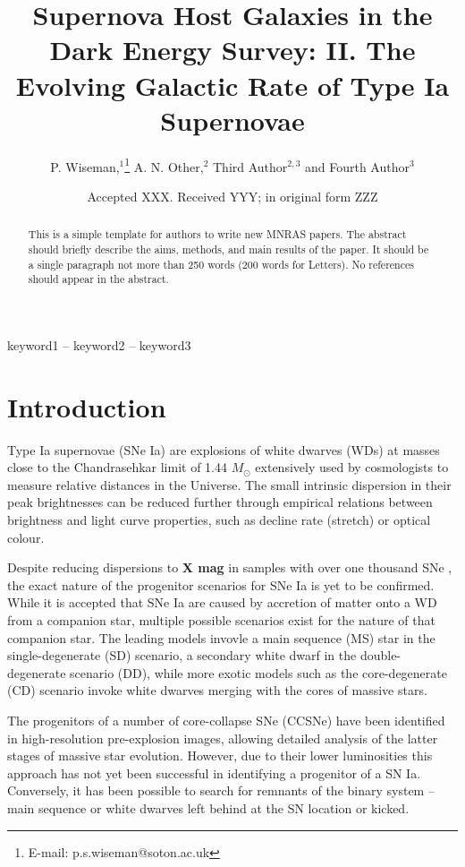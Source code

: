 \documentclass[fleqn,usenatbib]{mnras}
\title[DES SN Ia Galactic Rate]{Supernova Host Galaxies in the Dark Energy Survey: II. The Evolving Galactic Rate of Type Ia Supernovae}
\author[P. Wiseman et al.]{
P. Wiseman,$^{1}$\thanks{E-mail: p.s.wiseman@soton.ac.uk}
A. N. Other,$^{2}$
Third Author$^{2,3}$
and Fourth Author$^{3}$
\\
}
\date{Accepted XXX. Received YYY; in original form ZZZ}
\begin{document}
\label{firstpage}
\pagerange{\pageref{firstpage}--\pageref{lastpage}}
\maketitle

\begin{abstract}
This is a simple template for authors to write new MNRAS papers.
The abstract should briefly describe the aims, methods, and main results of the paper.
It should be a single paragraph not more than 250 words (200 words for Letters).
No references should appear in the abstract.
\end{abstract}

\begin{keywords}
keyword1 -- keyword2 -- keyword3
\end{keywords}



\section{Introduction}

Type Ia supernovae (SNe Ia) are explosions of white dwarves (WDs) at masses close to the Chandrasehkar limit of 1.44 $M_{\odot}$ extensively used by cosmologists to measure relative distances in the Universe. The small intrinsic dispersion in their peak brightnesses can be reduced further through empirical relations between brightness and light curve properties, such as decline rate (stretch) or optical colour.

Despite reducing dispersions to \textbf{X mag} in samples with over one thousand SNe \citep{Scolnic2018}, the exact nature of the progenitor scenarios for SNe Ia is yet to be confirmed. While it is accepted that SNe Ia are caused by accretion of matter onto a WD from a companion star, multiple possible scenarios exist for the nature of that companion star. The leading models invovle a main sequence (MS) star in the single-degenerate (SD) scenario, a secondary white dwarf in the double-degenerate scenario (DD), while more exotic models such as the core-degenerate (CD) scenario invoke white dwarves merging with the cores of massive stars.

The progenitors of a number of core-collapse SNe (CCSNe) have been identified in high-resolution pre-explosion images, allowing detailed analysis of the latter stages of massive star evolution. However, due to their lower luminosities this approach has not yet been successful in identifying a progenitor of a SN Ia. Conversely, it has been possible to search for remnants of the binary system -- main sequence or white dwarves left behind at the SN location or kicked. 
\end{document}
